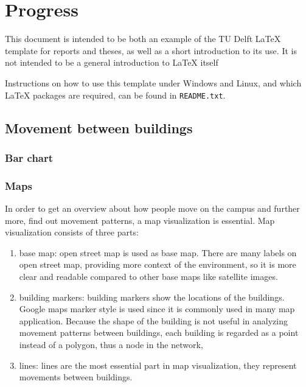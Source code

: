 \chapter{Progress}
\setcounter{secnumdepth}{4}
\setcounter{tocdepth}{4}
This document is intended to be both an example of the TU Delft \LaTeX{} template for reports and theses, as well as a short introduction to its use. It is not intended to be a general introduction to \LaTeX{} itself

Instructions on how to use this template under Windows and Linux, and which \LaTeX{} packages are required, can be found in \texttt{README.txt}.

\section{Movement between buildings}
\subsection{Bar chart}
\subsection{Maps}
In order to get an overview about how people move on the campus and further more,  find out movement patterns, a map visualization is essential. Map visualization consists of three parts: 
\begin{enumerate}
\item base map: open street map is used as base map. There are many labels on open street map, providing more context of the environment, so it is more clear and readable compared to other base maps like satellite images.
\item building markers: building markers show the locations of the buildings. Google maps marker style is used since it is commonly used in many map application. Because the shape of the building is not useful in analyzing movement patterns between buildings, each building is regarded as a point instead of a polygon, thus a node in the network, 
\item lines: lines are the most essential part in map visualization, they represent movements between buildings.
\end{enumerate}

